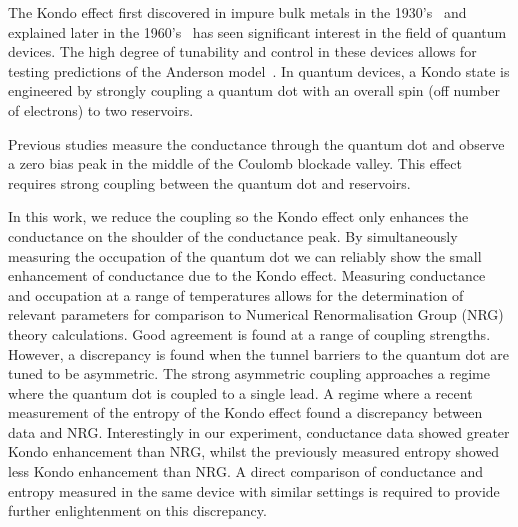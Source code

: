 The Kondo effect first discovered in impure bulk metals in the 1930’s~\cite{de_haas} and explained later in the 1960’s~\cite{jun_kondo} has seen significant interest in the field of quantum devices. The high degree of tunability and control in these devices allows for testing predictions of the Anderson model~\cite{costi_kondo_mv_eo_regime}. In quantum devices, a Kondo state is engineered by strongly coupling a quantum dot with an overall spin (off number of electrons) to two reservoirs. 

Previous studies measure the conductance through the quantum dot and observe a zero bias peak in the middle of the Coulomb blockade valley. This effect requires strong coupling between the quantum dot and reservoirs.

In this work, we reduce the coupling so the Kondo effect only enhances the conductance on the shoulder of the conductance peak. By simultaneously measuring the occupation of the quantum dot we can reliably show the small enhancement of conductance due to the Kondo effect. Measuring conductance and occupation at a range of temperatures allows for the determination of relevant parameters for comparison to Numerical Renormalisation Group (NRG) theory calculations. Good agreement is found at a range of coupling strengths. However, a discrepancy is found when the tunnel barriers to the quantum dot are tuned to be asymmetric. The strong asymmetric coupling approaches a regime where the quantum dot is coupled to a single lead. A regime where a recent measurement of the entropy of the Kondo effect found a discrepancy between data and NRG. Interestingly in our experiment, conductance data showed greater Kondo enhancement than NRG, whilst the previously measured entropy showed less Kondo enhancement than NRG. A direct comparison of conductance and entropy measured in the same device with similar settings is required to provide further enlightenment on this discrepancy. 

